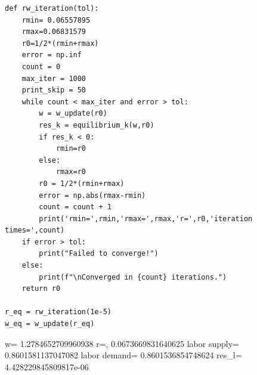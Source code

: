 \documentclass[a4paper, 12pt]{ctexart}
\begin{document}
\begin{lstlisting}
def rw_iteration(tol):
    rmin= 0.06557895
    rmax=0.06831579
    r0=1/2*(rmin+rmax)
    error = np.inf
    count = 0
    max_iter = 1000
    print_skip = 50
    while count < max_iter and error > tol:
        w = w_update(r0)
        res_k = equilibrium_k(w,r0)
        if res_k < 0:
            rmin=r0
        else:
            rmax=r0
        r0 = 1/2*(rmin+rmax)
        error = np.abs(rmax-rmin)
        count = count + 1
        print('rmin=',rmin,'rmax=',rmax,'r=',r0,'iteration times=',count)
    if error > tol:
        print("Failed to converge!")
    else:
        print(f"\nConverged in {count} iterations.")
    return r0 

r_eq = rw_iteration(1e-5)
w_eq = w_update(r_eq)
\end{lstlisting}

\begin{figure}[h]
    \centering
    \nonumber
\end{figure}

w= 1.2784652709960938 r=, 0.0673669831640625 labor supply= 0.8601581137047082 labor demand= 0.8601536854748624 res\_l= 4.428229845809817e-06
\end{document}
